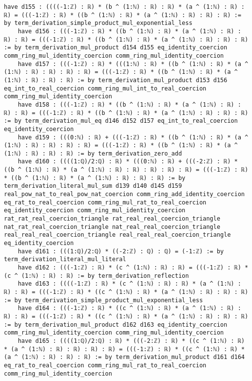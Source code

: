 \documentclass{article}
\begin{document}
\begin{tcolorbox}[colback=white!10, width=\linewidth]
\begin{lstlisting}[language=Lean4]
    have d155 : ((((-1:ℤ) : ℝ) * (b ^ (1:ℕ) : ℝ) : ℝ) * (a ^ (1:ℕ) : ℝ) : ℝ) = (((-1:ℤ) : ℝ) * ((b ^ (1:ℕ) : ℝ) * (a ^ (1:ℕ) : ℝ) : ℝ) : ℝ) := by term_derivation_simple_product_mul_exponential_less
    have d156 : (((-1:ℤ) : ℝ) * ((b ^ (1:ℕ) : ℝ) * (a ^ (1:ℕ) : ℝ) : ℝ) : ℝ) = (((-1:ℤ) : ℝ) * ((b ^ (1:ℕ) : ℝ) * (a ^ (1:ℕ) : ℝ) : ℝ) : ℝ) := by term_derivation_mul_product d154 d155 eq_identity_coercion comm_ring_mul_identity_coercion comm_ring_mul_identity_coercion
    have d157 : (((-1:ℤ) : ℝ) * (((1:ℕ) : ℝ) * ((b ^ (1:ℕ) : ℝ) * (a ^ (1:ℕ) : ℝ) : ℝ) : ℝ) : ℝ) = (((-1:ℤ) : ℝ) * ((b ^ (1:ℕ) : ℝ) * (a ^ (1:ℕ) : ℝ) : ℝ) : ℝ) := by term_derivation_mul_product d153 d156 eq_int_to_real_coercion comm_ring_mul_int_to_real_coercion comm_ring_mul_identity_coercion
    have d158 : (((-1:ℤ) : ℝ) * ((b ^ (1:ℕ) : ℝ) * (a ^ (1:ℕ) : ℝ) : ℝ) : ℝ) = (((-1:ℤ) : ℝ) * ((b ^ (1:ℕ) : ℝ) * (a ^ (1:ℕ) : ℝ) : ℝ) : ℝ) := by term_derivation_mul_eq d146 d152 d157 eq_int_to_real_coercion eq_identity_coercion
    have d159 : (((0:ℕ) : ℝ) + (((-1:ℤ) : ℝ) * ((b ^ (1:ℕ) : ℝ) * (a ^ (1:ℕ) : ℝ) : ℝ) : ℝ) : ℝ) = (((-1:ℤ) : ℝ) * ((b ^ (1:ℕ) : ℝ) * (a ^ (1:ℕ) : ℝ) : ℝ) : ℝ) := by term_derivation_zero_add
    have d160 : ((((1:ℚ)/2:ℚ) : ℝ) * (((0:ℕ) : ℝ) + (((-2:ℤ) : ℝ) * ((b ^ (1:ℕ) : ℝ) * (a ^ (1:ℕ) : ℝ) : ℝ) : ℝ) : ℝ) : ℝ) = (((-1:ℤ) : ℝ) * ((b ^ (1:ℕ) : ℝ) * (a ^ (1:ℕ) : ℝ) : ℝ) : ℝ) := by term_derivation_literal_mul_sum d139 d140 d145 d159 real_pow_nat_to_real_pow_nat_coercion comm_ring_add_identity_coercion eq_rat_to_real_coercion comm_ring_mul_rat_to_real_coercion eq_identity_coercion comm_ring_mul_identity_coercion rat_rat_real_coercion_triangle rat_real_real_coercion_triangle nat_rat_real_coercion_triangle nat_real_real_coercion_triangle real_real_real_coercion_triangle real_real_real_coercion_triangle eq_identity_coercion
    have d161 : (((1:ℚ)/2:ℚ) * ((-2:ℤ) : ℚ) : ℚ) = (-1:ℤ) := by term_derivation_literal_mul_literal
    have d162 : (((-1:ℤ) : ℝ) * (c ^ (1:ℕ) : ℝ) : ℝ) = (((-1:ℤ) : ℝ) * (c ^ (1:ℕ) : ℝ) : ℝ) := by term_derivation_reflection
    have d163 : ((((-1:ℤ) : ℝ) * (c ^ (1:ℕ) : ℝ) : ℝ) * (a ^ (1:ℕ) : ℝ) : ℝ) = (((-1:ℤ) : ℝ) * ((c ^ (1:ℕ) : ℝ) * (a ^ (1:ℕ) : ℝ) : ℝ) : ℝ) := by term_derivation_simple_product_mul_exponential_less
    have d164 : (((-1:ℤ) : ℝ) * ((c ^ (1:ℕ) : ℝ) * (a ^ (1:ℕ) : ℝ) : ℝ) : ℝ) = (((-1:ℤ) : ℝ) * ((c ^ (1:ℕ) : ℝ) * (a ^ (1:ℕ) : ℝ) : ℝ) : ℝ) := by term_derivation_mul_product d162 d163 eq_identity_coercion comm_ring_mul_identity_coercion comm_ring_mul_identity_coercion
    have d165 : ((((1:ℚ)/2:ℚ) : ℝ) * (((-2:ℤ) : ℝ) * ((c ^ (1:ℕ) : ℝ) * (a ^ (1:ℕ) : ℝ) : ℝ) : ℝ) : ℝ) = (((-1:ℤ) : ℝ) * ((c ^ (1:ℕ) : ℝ) * (a ^ (1:ℕ) : ℝ) : ℝ) : ℝ) := by term_derivation_mul_product d161 d164 eq_rat_to_real_coercion comm_ring_mul_rat_to_real_coercion comm_ring_mul_identity_coercion

\end{lstlisting}
\end{tcolorbox}
\end{document}
